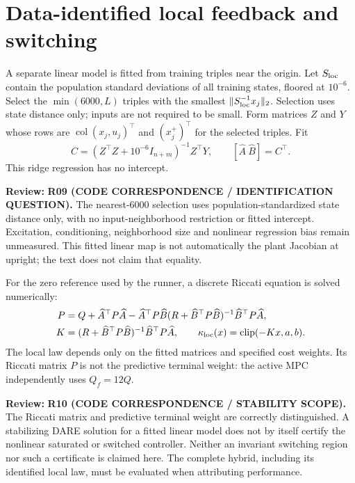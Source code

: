 \documentclass[11pt]{article}
\newcommand{\col}{\operatorname{col}}
\newcommand{\clip}{\operatorname{clip}}
\newcommand{\review}[1]{\par\noindent\textcolor{red!70!black}{\textbf{Review:} #1}\par}
\begin{document}
\section{Data-identified local feedback and switching}
A separate linear model is fitted from training triples near the origin. Let $S_{\rm loc}$ contain the population standard deviations of all training states, floored at $10^{-6}$. Select the $\min(6000,L)$ triples with the smallest $\|S_{\rm loc}^{-1}x_j\|_2$. Selection uses state distance only; inputs are not required to be small. Form matrices $Z$ and $Y$ whose rows are $\col(x_j,u_j)^\top$ and $(x_j^+)^\top$ for the selected triples. Fit
\begin{equation}\label{eq:ridge}
C=(Z^\top Z+10^{-6}I_{n+m})^{-1}Z^\top Y,\qquad [\widehat A\ \widehat B]=C^\top.
\end{equation}
This ridge regression has no intercept.
\review{\textbf{R09 (CODE CORRESPONDENCE / IDENTIFICATION QUESTION).} The nearest-6000 selection uses population-standardized state distance only, with no input-neighborhood restriction or fitted intercept. Excitation, conditioning, neighborhood size and nonlinear regression bias remain unmeasured. This fitted linear map is not automatically the plant Jacobian at upright; the text does not claim that equality.}
 For the zero reference used by the runner, a discrete Riccati equation is solved numerically:
\begin{align}
P&=Q+\widehat A^\top P\widehat A-\widehat A^\top P\widehat B(R+\widehat B^\top P\widehat B)^{-1}\widehat B^\top P\widehat A,\label{eq:dare}\\
K&=(R+\widehat B^\top P\widehat B)^{-1}\widehat B^\top P\widehat A,\qquad
\kappa_{\rm loc}(x)=\clip(-Kx,a,b).\label{eq:local}
\end{align}
The local law depends only on the fitted matrices and specified cost weights. Its Riccati matrix $P$ is not the predictive terminal weight: the active MPC independently uses $Q_f=12Q$.
\review{\textbf{R10 (CODE CORRESPONDENCE / STABILITY SCOPE).} The Riccati matrix and predictive terminal weight are correctly distinguished. A stabilizing DARE solution for a fitted linear model does not by itself certify the nonlinear saturated or switched controller. Neither an invariant switching region nor such a certificate is claimed here. The complete hybrid, including its identified local law, must be evaluated when attributing performance.}
\end{document}
